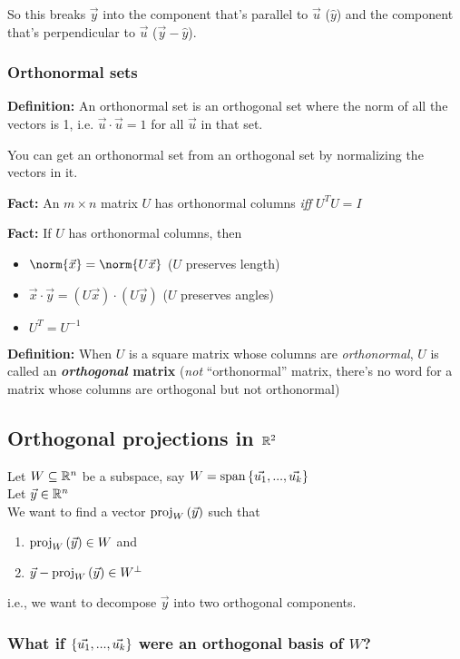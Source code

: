 So this breaks $\Vec y$ into the component that's parallel to $\Vec u$ ($\hat y$) and the component that's perpendicular to $\Vec u$ ($\Vec y - \hat y$).

\subsubsection*{Orthonormal sets}

\textbf{Definition:} An orthonormal set is an orthogonal set where the norm of all the vectors is 1, i.e. $\Vec u \cdot \Vec u = 1$ for all $\Vec u$ in that set.

You can get an orthonormal set from an orthogonal set by normalizing the vectors in it.

\textbf{Fact:} An $m \times n$ matrix $U$ has orthonormal columns \emph{iff} $U^TU = I$

\textbf{Fact:} If $U$ has orthonormal columns, then
\begin{itemize}
    \item $\norm{\Vec x} = \norm{U\Vec x}$ ($U$ preserves length)
    \item $\Vec x \cdot \Vec y = (U\Vec x) \cdot (U\Vec y)$ ($U$ preserves angles)
    \item $U^T = U^{-1}$
\end{itemize}

\textbf{Definition:} When $U$ is a square matrix whose columns are \emph{orthonormal}, $U$ is called an \textbf{\emph{orthogonal} matrix} (\emph{not} ``orthonormal'' matrix, there's no word for a matrix whose columns are orthogonal but not orthonormal)

\subsection{Orthogonal projections in $\mathbb{R}^2$}

Let $W \subseteq \mathbb{R}^n$ be a subspace, say $W = \mathrm{span}\left\{\Vec{u_1}, ..., \Vec{u_k}\right\}$\\
Let $\Vec{y} \in \mathbb{R}^n$\\
We want to find a vector $\mathrm{proj}_{W}\left(\Vec y\right)$ such that
\begin{enumerate}
    \item $\mathrm{proj}_{W}\left(\Vec y\right) \in W$ and
    \item $\Vec y - \mathrm{proj}_{W}\left(\Vec y\right) \in W^{\bot}$
\end{enumerate}
i.e., we want to decompose $\Vec y$ into two orthogonal components.

\subsubsection*{What if $\left\{\Vec{u_1}, ..., \Vec{u_k}\right\}$ were an orthogonal basis of $W$?}

